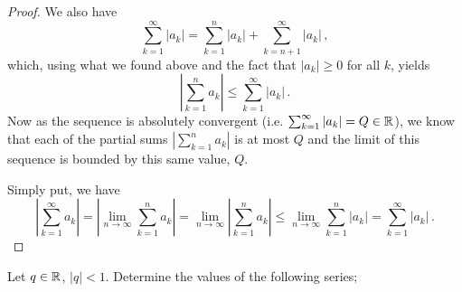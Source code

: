 \documentclass[week=5]{homework}
\begin{document}
\begin{questions}
\begin{proof}
	    	We also have
	    	\[
		    	\sum_{k=1}^{\infty} |a_k| = \sum_{k=1}^{n} |a_k| + \sum_{k=n+1}^{\infty} |a_k|\,,
	    	\]
	    	which, using what we found above and the fact that $|a_k| \geq 0$ for all $k$, yields
	    	\[
		    	\left| \sum_{k=1}^{n} a_k \right| \leq \sum_{k=1}^{\infty} |a_k|\,.
	    	\]
	    	Now as the sequence is absolutely convergent (i.e. $\sum_{k=1}^{\infty} |a_k| = Q \in \mathbb{R}$), we know that each of the partial sums $\left|\sum_{k=1}^{n} a_k\right|$ is at most $Q$ and the limit of this sequence is bounded by this same value, $Q$.
	    	
	    	Simply put, we have
	    	\[
	    	\left| \sum_{k=1}^{\infty} a_k \right| = \left| \lim_{n\to\infty} \sum_{k=1}^{n} a_k \right| = \lim_{n\to\infty} \left|\sum_{k=1}^{n} a_k\right| \leq \lim_{n\to\infty} \sum_{k=1}^{n} |a_k| = \sum_{k=1}^{\infty} |a_k|\,.
	    	\]
	    \end{proof}
    
	    \question
	    Let $q \in \mathbb{R}$, $|q| < 1$. Determine the values of the following series;
	    
\end{questions}
\end{document}
